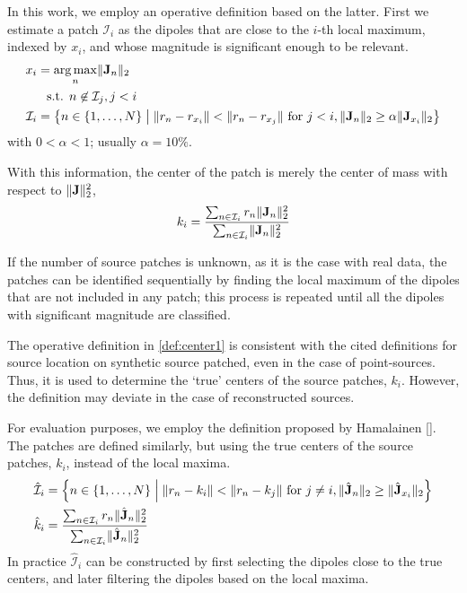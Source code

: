 In this work, we employ an operative definition based on the latter.
%
First we estimate a patch $\mathcal{I}_i$ as the dipoles that are close to the $i$-th local maximum, indexed by $x_i$, and whose magnitude is significant enough to be relevant.
\begin{align}
x_i &= \operatorname*{arg\,max}_{n} \lVert \mathbf{J}_n \rVert_2
\nonumber \\
&\phantom{=} \text{s.t. }
n\not\in \mathcal{I}_j, j<i
\\
\mathcal{I}_i
&=
\left\{  n\in \left\{ 1, \dots, N \right\} \;\middle|\; 
\lVert r_n - r_{x_i} \rVert < \lVert r_n - r_{x_j} \rVert \text{ for } j<i,
\lVert \mathbf{J}_n \rVert_2\geq \alpha\lVert \mathbf{J}_{x_i} \rVert_2  \right\}
\end{align}
with $0<\alpha<1$; usually $\alpha=10\%$.

With this information, the center of the patch is merely the center of mass with respect to $\lVert \mathbf{J} \rVert_2^2$,
\begin{align}
k_i = 
\frac{\sum_{n\in \mathcal{I}_i} r_n \lVert \mathbf{J}_n \rVert_2^2 }{\sum_{n\in \mathcal{I}_i} \lVert \mathbf{J}_n \rVert_2^2}
\label{def:center1}
\end{align}

If the number of source patches is unknown, as it is the case with real data, the patches can be identified sequentially by finding the local maximum of the dipoles that are not included in any patch; this process is repeated until all the dipoles with significant magnitude are classified.

The operative definition in \eqref{def:center1} is consistent with the cited definitions for source location on synthetic source patched, even in the case of point-sources.
%
Thus, it is used to determine the `true' centers of the source patches, $k_i$.
%
However, the definition may deviate in the case of reconstructed sources.

For evaluation purposes, we employ the definition proposed by Hamalainen []. 
%
The patches are defined similarly, but using the true centers of the source patches, $k_i$, instead of the local maxima.
\begin{align}
\hat{\mathcal{I}}_i
&=
\left\{  n\in \left\{ 1, \dots, N \right\} \;\middle|\; 
\lVert r_n - k_i \rVert < \lVert r_n - k_j \rVert \text{ for } j\neq i,
\lVert \hat{\mathbf{J}}_n \rVert_2\geq \lVert \hat{\mathbf{J}}_{x_i} \rVert_2  \right\}
\\
\hat{k}_i &= 
\frac{\sum_{n\in \mathcal{I}_i} r_n \lVert \hat{\mathbf{J}}_n \rVert_2^2 }{\sum_{n\in \mathcal{I}_i} \lVert \hat{\mathbf{J}}_n \rVert_2^2}
\end{align}
In practice $\hat{\mathcal{I}}_i$ can be constructed by first selecting the dipoles close to the true centers, and later filtering the dipoles based on the local maxima.

